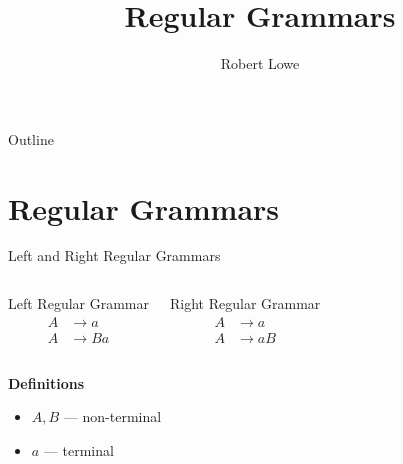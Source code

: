 \documentclass[handout]{beamer}
\title{Regular Grammars}
\author{Robert Lowe}
\institute[Southeast Missouri State University] %
{
  Department of Computer Science\\
  Southeast Missouri State University
}
\date[]{}
\begin{document}
\begin{frame}
  \titlepage
\end{frame}

\begin{frame}{Outline}
  \tableofcontents
\end{frame}




\section {Regular Grammars}
\begin{frame}{Left and Right Regular Grammars}
\begin{columns}
\begin{block}{Left Regular Grammar}
    \begin{align*}
        A & \rightarrow a \\
        A & \rightarrow Ba
    \end{align*}
\end{block}

\begin{block}{Right Regular Grammar}
    \begin{align*}
        A & \rightarrow a \\
        A & \rightarrow aB
    \end{align*}
\end{block}

\end{columns}

\vspace{1cm}
{\bf Definitions}
\begin{itemize}
    \item $A,B$ --- non-terminal
    \item $a$ --- terminal
\end{itemize}
\end{frame}
\end{document}
